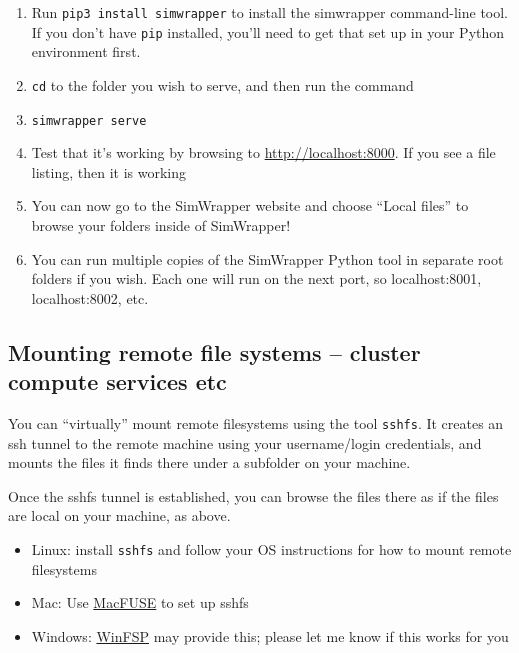 \begin{enumerate}
\def\labelenumi{\arabic{enumi}.}
\tightlist
\item
  Run \texttt{pip3\ install\ simwrapper} to install the simwrapper
  command-line tool. If you don't have \texttt{pip} installed, you'll
  need to get that set up in your Python environment first.
\item
  \texttt{cd} to the folder you wish to serve, and then run the command
\item
  \texttt{simwrapper\ serve}
\item
  Test that it's working by browsing to \url{http://localhost:8000}. If
  you see a file listing, then it is working
\item
  You can now go to the SimWrapper website and choose ``Local files'' to
  browse your folders inside of SimWrapper!
\item
  You can run multiple copies of the SimWrapper Python tool in separate
  root folders if you wish. Each one will run on the next port, so
  localhost:8001, localhost:8002, etc.
\end{enumerate}

\hypertarget{mounting-remote-file-systems-cluster-compute-services-etc}{%
\subsection{Mounting remote file systems -- cluster compute services
etc}\label{mounting-remote-file-systems-cluster-compute-services-etc}}

You can ``virtually'' mount remote filesystems using the tool
\texttt{sshfs}. It creates an ssh tunnel to the remote machine using
your username/login credentials, and mounts the files it finds there
under a subfolder on your machine.

Once the sshfs tunnel is established, you can browse the files there as
if the files are local on your machine, as above.

\begin{itemize}
\tightlist
\item
  Linux: install \texttt{sshfs} and follow your OS instructions for how
  to mount remote filesystems
\item
  Mac: Use \href{https://osxfuse.github.io/}{MacFUSE} to set up sshfs
\item
  Windows: \href{https://winfsp.dev/}{WinFSP} may provide this; please
  let me know if this works for you
\end{itemize}

